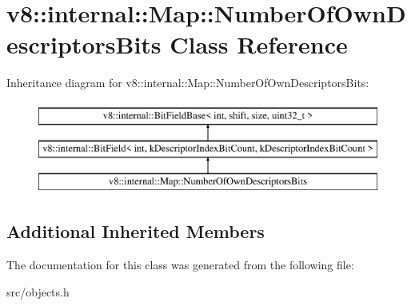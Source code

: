 \hypertarget{classv8_1_1internal_1_1_map_1_1_number_of_own_descriptors_bits}{}\section{v8\+:\+:internal\+:\+:Map\+:\+:Number\+Of\+Own\+Descriptors\+Bits Class Reference}
\label{classv8_1_1internal_1_1_map_1_1_number_of_own_descriptors_bits}
Inheritance diagram for v8\+:\+:internal\+:\+:Map\+:\+:Number\+Of\+Own\+Descriptors\+Bits\+:\begin{figure}[H]
\begin{center}
\leavevmode
\includegraphics[height=3.000000cm]{classv8_1_1internal_1_1_map_1_1_number_of_own_descriptors_bits}
\end{center}
\end{figure}
\subsection*{Additional Inherited Members}


The documentation for this class was generated from the following file\+:\begin{DoxyCompactItemize}
\item 
src/objects.\+h\end{DoxyCompactItemize}
